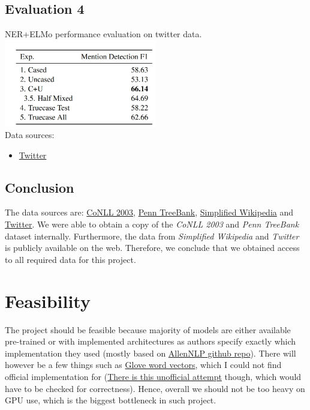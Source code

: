 \documentclass{article}
\begin{document}
\subsection*{Evaluation 4}
NER+ELMo performance evaluation on twitter data.
\\
\includegraphics[width=0.5\textwidth]{stat4}
\\
Data sources:
\begin{itemize}
	\item \href{https://github.com/GateNLP/broad_twitter_corpus}{Twitter}
\end{itemize}


\subsection*{Conclusion}
The data sources are: \href{https://dl.acm.org/doi/10.3115/1119176.1119195}{CoNLL 2003}, \href{https://www.seas.upenn.edu/~pdtb/}{Penn TreeBank}, \href{https://cs.pomona.edu/~dkauchak/simplification/}{Simplified Wikipedia} and \href{https://github.com/GateNLP/broad_twitter_corpus}{Twitter}.
We were able to obtain a copy of the \textit{CoNLL 2003} and \textit{Penn TreeBank} dataset internally. Furthermore, the data from \textit{Simplified Wikipedia} and \textit{Twitter} is publicly available on the web. Therefore, we conclude that we obtained access to all required data for this project.



\section{Feasibility}
The project should be feasible because majority of models are either available pre-trained or with implemented architectures as authors specify exactly which implementation they used (mostly based on \href{https://github.com/allenai/allennlp}{AllenNLP github repo}).
There will however be a few things such as \href{https://nlp.stanford.edu/pubs/glove.pdf}{Glove word vectors}, which I could not find official implementation for (\href{https://github.com/hans/glove.py}{There is this unofficial attempt} though, which would have to be checked for correctness). Hence, overall we should not be too heavy on GPU use, which is the biggest bottleneck in such project.
\end{document}

